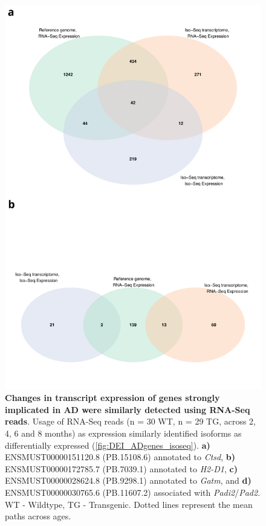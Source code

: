 \begin{figure}[!htp]
	\centering
	\includegraphics[page=19,scale = 0.55]{Figures/WholeDifferentialAnalysis.pdf}
	\captionsetup{width=0.95\textwidth}
	\caption[Changes in transcript expression of genes strongly implicated in AD were similarly detected using RNA-Seq reads]%
	{\textbf{Changes in transcript expression of genes strongly implicated in AD were similarly detected using RNA-Seq reads}. Usage of RNA-Seq reads (n = 30 WT, n = 29 TG, across 2, 4, 6 and 8 months) as expression similarly identified isoforms as differentially expressed (\cref{fig:DEI_ADgenes_isoseq}). \textbf{a)} ENSMUST00000151120.8 (PB.15108.6) annotated to \textit{Ctsd}, \textbf{b)} ENSMUST00000172785.7 (PB.7039.1) annotated to \textit{H2-D1}, \textbf{c)} ENSMUST00000028624.8 (PB.9298.1) annotated to \textit{Gatm}, and \textbf{d)} ENSMUST00000030765.6 (PB.11607.2) associated with \textit{Padi2}/\textit{Pad2}.  WT - Wildtype, TG - Transgenic. Dotted lines represent the mean paths across ages.}   
	\label{fig:DEI_ADgenes_rnaseq}
\end{figure}

